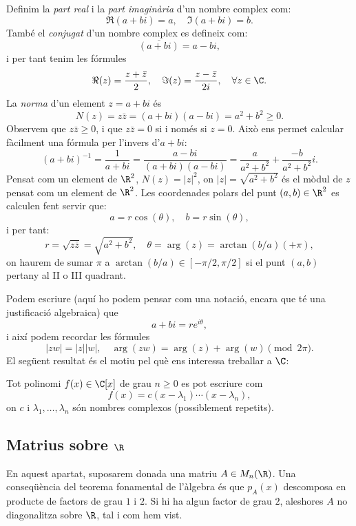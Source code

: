 Definim la \emph{part real} i la \emph{part imaginària}  d'un nombre complex com:
\[
\Re(a+bi) = a,\quad \Im(a+bi) = b.
\]
També el \emph{conjugat} d'un nombre complex es defineix com:
\[
\overline{(a+bi)} = a-bi,
\]
i per tant tenim les fórmules
\[
\Re(z) = \frac{z+\bar z}{2},\quad \Im(z)=\frac{z-\bar z}{2i},\quad \forall z\in\C.
\]
La \emph{norma} d'un element $z=a+bi$ és
\[
N(z) = z\bar z = (a+bi)(a-bi) = a^2+b^2\geq 0.
\]
Observem que $z\bar z \geq 0$, i que $z\bar z = 0$ si i només si $z=0$. Això ens permet calcular fàcilment una fórmula per l'invers d'$a+bi$:
\[
(a+bi)^{-1} = \frac{1}{a+bi} = \frac{a-bi}{(a+bi)(a-bi)} = \frac{a}{a^2+b^2}+\frac{-b}{a^2+b^2}i.
\]
Pensat com un element de $\R^2$, $N(z)=|z|^2$, on $|z|=\sqrt{a^2+b^2}$ és el mòdul de $z$ pensat com un element de $\R^2$. Les coordenades polars del punt $(a,b)\in\R^2$ es calculen fent servir que:
\[
a = r\cos(\theta),\quad b = r\sin(\theta),
\]
i per tant:
\[
r = \sqrt{z\bar z}=\sqrt{a^2+b^2},\quad \theta = \arg(z) = \arctan(b/a) (+\pi),
\]
on haurem de sumar $\pi$ a $\arctan(b/a)\in[-\pi/2,\pi/2]$ si el punt $(a,b)$ pertany al II o III quadrant.

Podem escriure (aquí ho podem pensar com una notació, encara que té una justificació algebraica) que
\[
a+bi = re^{i\theta},
\]
i així podem recordar les fórmules
\[
|zw|=|z||w|,\quad \arg(zw)=\arg(z)+\arg(w)\pmod{2\pi}.
\]
El següent resultat és el motiu pel què ens interessa treballar a $\C$:

\begin{teorema}
Tot polinomi $f(x)\in \C[x]$ de grau $n\geq 0$ es pot escriure com
\[
f(x) = c (x-\lambda_1)\cdots (x-\lambda_n),
\]
on $c$ i $\lambda_1,\ldots,\lambda_n$ són nombres complexos (possiblement repetits).
\end{teorema}


\subsection{Matrius sobre \texorpdfstring{$\R$}{R}}
En aquest apartat, suposarem donada una matriu $A\in M_n(\R)$. Una conseqüència del teorema fonamental de l'àlgebra és que $p_A(x)$ descomposa en producte de factors de grau $1$ i $2$. Si hi ha algun factor de grau $2$, aleshores $A$ no diagonalitza sobre $\R$, tal i com hem vist.

